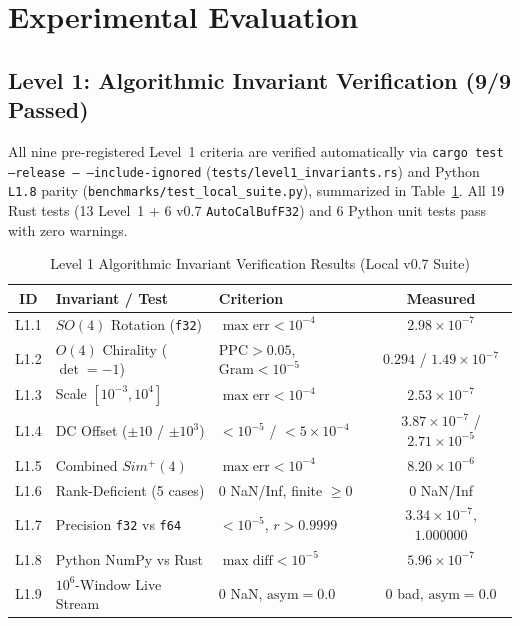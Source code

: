 \documentclass[conference]{IEEEtran}
\begin{document}
\section{Experimental Evaluation}

\subsection{Level 1: Algorithmic Invariant Verification (9/9 Passed)}
All nine pre-registered Level~1 criteria are verified automatically via \texttt{cargo test --release -- --include-ignored} (\texttt{tests/level1\_invariants.rs}) and Python \texttt{L1.8} parity (\texttt{benchmarks/test\_local\_suite.py}), summarized in Table~\ref{tab:level1}. All 19 Rust tests (13 Level~1 + 6 v0.7 \texttt{AutoCalBufF32}) and 6 Python unit tests pass with zero warnings.

\begin{table}[t]
\centering
\caption{Level 1 Algorithmic Invariant Verification Results (Local v0.7 Suite)}
\label{tab:level1}
\begin{tabular}{@{}cllc@{}}
\toprule
\textbf{ID} & \textbf{Invariant / Test} & \textbf{Criterion} & \textbf{Measured} \\
\midrule
L1.1 & $SO(4)$ Rotation (\texttt{f32}) & $\max\text{err} < 10^{-4}$ & $2.98\times 10^{-7}$ \\
L1.2 & $O(4)$ Chirality ($\det=-1$) & $\text{PPC}>0.05$, $\text{Gram}<10^{-5}$ & $0.294$ / $1.49\times 10^{-7}$ \\
L1.3 & Scale $[10^{-3}, 10^4]$ & $\max\text{err} < 10^{-4}$ & $2.53\times 10^{-7}$ \\
L1.4 & DC Offset ($\pm 10$ / $\pm 10^3$) & $<10^{-5}$ / $<5\times 10^{-4}$ & $3.87\times 10^{-7}$ / $2.71\times 10^{-5}$ \\
L1.5 & Combined $Sim^+(4)$ & $\max\text{err} < 10^{-4}$ & $8.20\times 10^{-6}$ \\
L1.6 & Rank-Deficient (5 cases) & 0 NaN/Inf, finite $\ge 0$ & 0 NaN/Inf \\
L1.7 & Precision \texttt{f32} vs \texttt{f64} & $<10^{-5}$, $r>0.9999$ & $3.34\times 10^{-7}$, $1.000000$ \\
L1.8 & Python NumPy vs Rust & $\max\text{diff} < 10^{-5}$ & $5.96\times 10^{-7}$ \\
L1.9 & $10^6$-Window Live Stream & 0 NaN, $\text{asym}=0.0$ & 0 bad, $\text{asym}=0.0$ \\
\bottomrule
\end{tabular}
\end{table}
\end{document}
